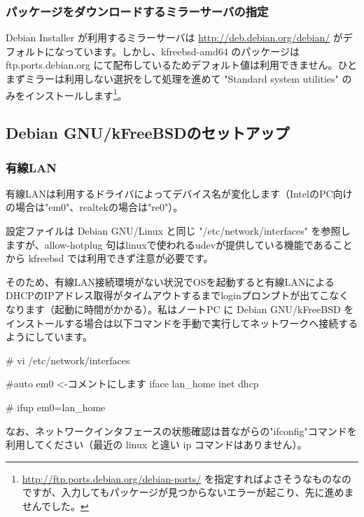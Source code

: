 \documentclass[mingoth,a4paper]{jsarticle}
\begin{document}
\subsubsection{パッケージをダウンロードするミラーサーバの指定}

Debian Installer が利用するミラーサーバは \url{http://deb.debian.org/debian/} がデフォルトになっています。しかし、kfreebsd-amd64 のパッケージは ftp.ports.debian.org にて配布しているためデフォルト値は利用できません。ひとまずミラーは利用しない選択をして処理を進めて "Standard system utilities" のみをインストールします\footnote{\url{http://ftp.ports.debian.org/debian-ports/} を指定すればよさそうなものなのですが、入力してもパッケージが見つからないエラーが起こり、先に進めませんでした。}。


\subsection{Debian GNU/kFreeBSDのセットアップ}

\subsubsection{有線LAN}

有線LANは利用するドライバによってデバイス名が変化します（IntelのPC向けの場合は"em0"、realtekの場合は"re0"）。

設定ファイルは Debian GNU/Linux と同じ "/etc/network/interfaces" を参照しますが、allow-hotplug 句はlinuxで使われるudevが提供している機能であることから kfreebsd では利用できず注意が必要です。

そのため、有線LAN接続環境がない状況でOSを起動すると有線LANによるDHCPのIPアドレス取得がタイムアウトするまでloginプロンプトが出てこなくなります（起動に時間がかかる）。私はノートPC に Debian GNU/kFreeBSD をインストールする場合は以下コマンドを手動で実行してネットワークへ接続するようにしています。

\begin{commandline}
# vi /etc/network/interfaces

#auto em0  <-コメントにします
iface lan_home inet dhcp
\end{commandline}

\begin{commandline}
# ifup em0=lan_home
\end{commandline}

なお、ネットワークインタフェースの状態確認は昔ながらの"ifconfig"コマンドを利用してください（最近の linux と違い ip コマンドはありません）。
\end{document}
